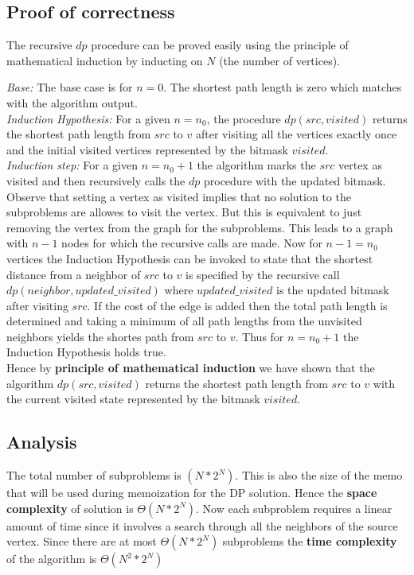\documentclass{article}
\begin{document}
\subsection{Proof of correctness}
The recursive $dp$ procedure can be proved easily using the principle of mathematical induction by inducting on $N$ (the number of vertices).

\textit{Base:}  The base case is for $n = 0$. The shortest path length is zero which matches with the algorithm output.\\

\textit{Induction Hypothesis: } For a given $n = n_0$, the procedure $dp(src, visited)$ returns the shortest path length from $src$ to $v$ after visiting all the vertices
exactly once and the initial visited vertices represented by the bitmask $visited$.\\

\textit{Induction step:} For a given $n = n_0 + 1$ the algorithm marks the $src$ vertex as visited and then recursively calls the $dp$ procedure
with the updated bitmask. Observe that setting a vertex as visited implies that no solution to the subproblems are allowes to visit the vertex.
But this is equivalent to just removing the vertex from the graph for the subproblems. This leads to a graph with $n - 1$ nodes for which the recursive calls 
are made. Now for $n - 1 = n_0$ vertices the Induction Hypothesis can be invoked to state that the shortest distance from a neighbor of $src$ to $v$ is specified
by the recursive call $dp(neighbor, updated\_visited)$ where $updated\_visited$ is the updated bitmask after visiting $src$. If the cost of the edge is added
then the total path length is determined and taking a minimum of all path lengths from the unvisited neighbors yields the shortes path from $src$ to $v$.
Thus for $n = n_0 + 1$ the Induction Hypothesis holds true.\\


Hence by \textbf{principle of mathematical induction} we have shown that the algorithm $dp(src, visited)$ returns the shortest path length from $src$ to $v$ with the current visited
state represented by the bitmask $visited$.

\subsection{Analysis}

The total number of subproblems is $(N*2^N)$. This is also the size of the memo that will be used during memoization for the DP solution.
Hence the \textbf{space complexity} of solution is $\Theta(N*2^N)$. Now each subproblem requires a linear amount of time since it involves a 
search through all the neighbors of the source vertex. Since there are at most $\Theta(N*2^N)$ subproblems the \textbf{time complexity} of the 
algorithm is $\Theta(N^2*2^N)$
\end{document}
